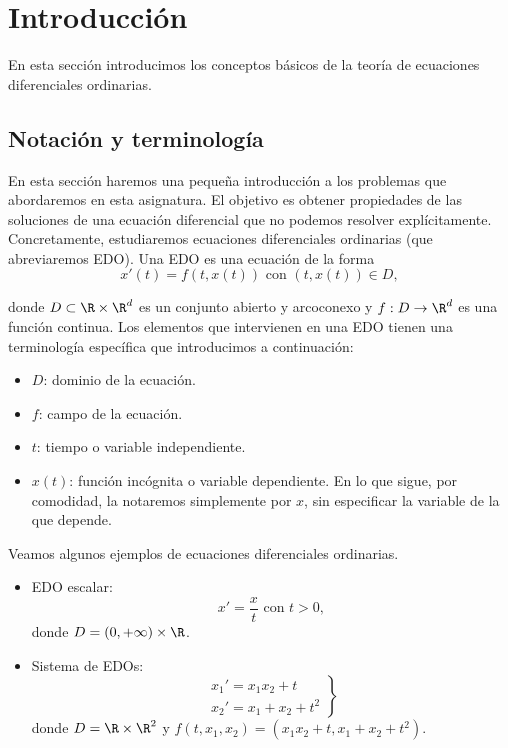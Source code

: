 \documentclass{article}
\begin{document}
\maketitle

\section{Introducción}

En esta sección introducimos los conceptos básicos de la teoría de ecuaciones diferenciales ordinarias.

\subsection{Notación y terminología}

En esta sección haremos una pequeña introducción a los problemas que abordaremos en esta
asignatura. El objetivo es obtener propiedades de las soluciones de una ecuación diferencial  que no podemos resolver explícitamente. Concretamente, estudiaremos ecuaciones diferenciales ordinarias (que
abreviaremos EDO). Una EDO es una ecuación de la forma
\[x'(t) = f(t,x(t)) \text{ con } (t,x(t)) \in D,\]

donde $D \subset \R \times \R^d$ es un conjunto abierto y arcoconexo y $f: D \to \R^d$ es una
función continua. Los elementos que intervienen en una EDO tienen una terminología específica que
introducimos a continuación:

\begin{itemize}
\item $D$: dominio de la ecuación.
\item $f$: campo de la ecuación.
\item $t$: tiempo o variable independiente.
\item $x(t)$: función incógnita o variable dependiente. En lo que sigue, por comodidad, la notaremos
  simplemente por $x$, sin especificar la variable de la que depende.
\end{itemize}

\begin{ex} Veamos algunos ejemplos de ecuaciones diferenciales ordinarias.
  
  \begin{itemize}
  \item EDO escalar:
    \[x' = \frac{x}{t} \text{ con } t > 0,\] donde $D = (0, +\infty) \times \R$.
  \item Sistema de EDOs:
    \[
      \left.
        \begin{array}{r}
          x_1' = x_1x_2 + t \\
          x_2' = x_1 + x_2 + t^2
        \end{array}
      \right\}
    \]
    donde $D = \R \times \R^2$ y $f(t, x_1, x_2) = (x_1x_2 + t, x_1 + x_2 + t^2)$. \qedhere
  \end{itemize}
\end{ex}
\end{document}
